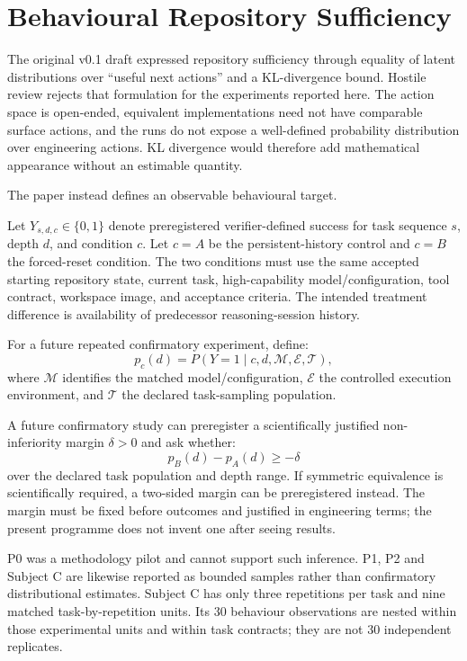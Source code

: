 \section{Behavioural Repository Sufficiency}
\label{sec:sufficiency}

The original v0.1 draft expressed repository sufficiency through equality of latent distributions over “useful next actions” and a KL-divergence bound. Hostile review rejects that formulation for the experiments reported here. The action space is open-ended, equivalent implementations need not have comparable surface actions, and the runs do not expose a well-defined probability distribution over engineering actions. KL divergence would therefore add mathematical appearance without an estimable quantity.

The paper instead defines an observable behavioural target.

Let $Y_{s,d,c}\in\{0,1\}$ denote preregistered verifier-defined success for task sequence $s$, depth $d$, and condition $c$. Let $c=A$ be the persistent-history control and $c=B$ the forced-reset condition. The two conditions must use the same accepted starting repository state, current task, high-capability model/configuration, tool contract, workspace image, and acceptance criteria. The intended treatment difference is availability of predecessor reasoning-session history.

For a future repeated confirmatory experiment, define:
\begin{equation}
p_c(d)=P(Y=1\mid c,d,\mathcal{M},\mathcal{E},\mathcal{T}),
\label{eq:behavioural-success}
\end{equation}
where $\mathcal{M}$ identifies the matched model/configuration, $\mathcal{E}$ the controlled execution environment, and $\mathcal{T}$ the declared task-sampling population.

A future confirmatory study can preregister a scientifically justified non-inferiority margin $\delta>0$ and ask whether:
\begin{equation}
p_B(d)-p_A(d) \ge -\delta
\label{eq:noninferiority-target}
\end{equation}
over the declared task population and depth range. If symmetric equivalence is scientifically required, a two-sided margin can be preregistered instead. The margin must be fixed before outcomes and justified in engineering terms; the present programme does not invent one after seeing results.

P0 was a methodology pilot and cannot support such inference. P1, P2 and Subject C are likewise reported as bounded samples rather than confirmatory distributional estimates. Subject C has only three repetitions per task and nine matched task-by-repetition units. Its 30 behaviour observations are nested within those experimental units and within task contracts; they are not 30 independent replicates.

